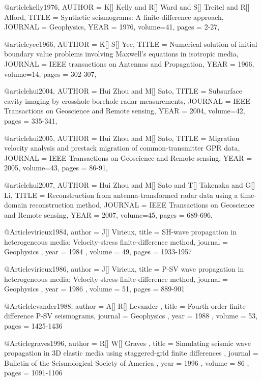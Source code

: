@article{kelly1976,
  AUTHOR =       {K[] Kelly and R[] Ward and S[] Treitel and R[] Alford},
  TITLE =        {Synthetic seismograms: A finite-difference approach},
  JOURNAL =      {Geophysics},
  YEAR =         {1976},
  volume=41,
  pages = {2-27},
}

@article{yee1966,
  AUTHOR =       {K[] S[] Yee},
  TITLE =        {Numerical solution of initial boundary value problems involving Maxwell's equations in isotropic media},
  JOURNAL =      {IEEE transactions on Antennas and Propagation},
  YEAR =         {1966},
  volume=14,
  pages = {302-307},
}

@article{hui2004,
  AUTHOR =       {Hui Zhou and M[] Sato},
  TITLE =        {Subsurface cavity imaging by crosshole borehole radar measurements},
  JOURNAL =      {IEEE Transactions on Geoscience and Remote sensing},
  YEAR =         {2004},
  volume=42,
  pages = {335-341},
}



@article{hui2005,
  AUTHOR =       {Hui Zhou and M[] Sato},
  TITLE =        {Migration velocity analysis and prestack migration of common-transmitter GPR data},
  JOURNAL =      {IEEE Transactions on Geoscience and Remote sensing},
  YEAR =         {2005},
  volume=43,
  pages = {86-91},
}

@article{hui2007,
  AUTHOR =       {Hui Zhou and M[] Sato and T[] Takenaka and G[] Li},
  TITLE =        {Reconstruction from antenna-transformed radar data using a time-domain reconstruction method},
  JOURNAL =      {IEEE Transactions on Geoscience and Remote sensing},
  YEAR =         {2007},
  volume=45,
  pages = {689-696},
}

@Article{virieux1984,
 author =  { J[] Virieux},
 title =   { SH-wave propagation in heterogeneous media: Velocity-stress finite-difference method},
 journal = { Geophysics },
 year =    { 1984 },
 volume =  { 49},
 pages =   { 1933-1957 }
}

@Article{virieux1986,
 author =  { J[] Virieux},
 title =   { P-SV wave propagation in heterogeneous media: Velocity-stress finite-difference method},
 journal = { Geophysics },
 year =    { 1986 },
 volume =  { 51},
 pages =   { 889-901 }
}

@Article{levander1988,
 author =  { A[] R[] Levander },
 title =   { Fourth-order finite-difference P-SV seismograms},
 journal = { Geophysics },
 year =    { 1988 },
 volume =  { 53},
 pages =   { 1425-1436 }
}

@Article{graves1996,
 author =  { R[] W[] Graves },
 title =   { Simulating seismic wave propagation in 3{D} elastic media using staggered-grid finite differences },
 journal = { Bulletin of the Seismological Society of America },
 year =    { 1996 },
 volume =  { 86 },
 pages =   { 1091-1106 }
}

